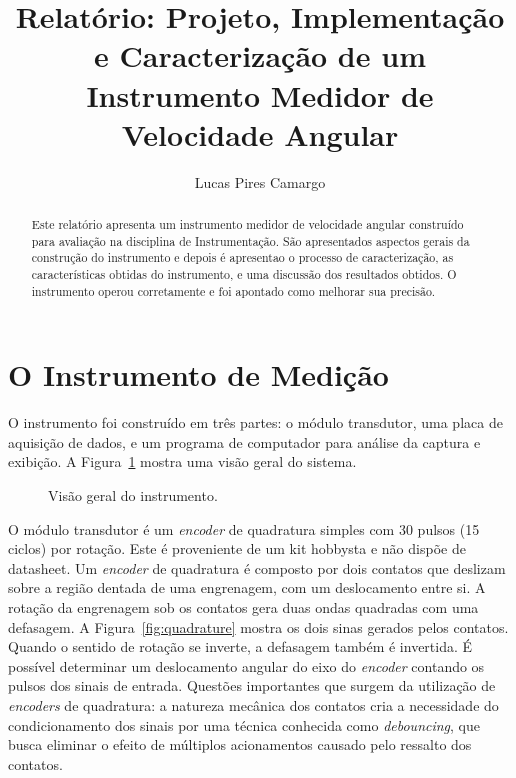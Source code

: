 \documentclass[a4paper,9pt,twocolumn]{article}
\title{Relatório: Projeto, Implementação e Caracterização de um Instrumento Medidor de Velocidade Angular}
\author{Lucas Pires Camargo}
\newcommand{\fig}[4][ht!]{
  \begin{figure}[#1]
    {\centering{\texttt{[image: \#2]}}\par}
    \caption{#3}
    \label{fig:#2}
  \end{figure}
}
\begin{document}
\maketitle

\begin{abstract}
Este relatório apresenta um instrumento medidor de velocidade angular construído para avaliação na disciplina de Instrumentação. 
São apresentados aspectos gerais da construção do instrumento e depois é apresentao o processo de caracterização, as 
características obtidas do instrumento, e uma discussão dos resultados obtidos. O instrumento operou corretamente e
foi apontado como melhorar sua precisão.
\end{abstract}


\section{O Instrumento de Medição}

O instrumento foi construído em três partes: o módulo transdutor, uma placa de aquisição de dados, 
e um programa de computador para análise da captura e exibição. A Figura~\ref{fig:impl} mostra uma visão geral do sistema.

\fig{impl}{Visão geral do instrumento.}{width=\columnwidth}

O módulo transdutor é um \emph{encoder} de quadratura simples com 30 pulsos (15 ciclos) por rotação. Este é proveniente de um kit hobbysta e não dispõe 
de datasheet. Um \emph{encoder} de quadratura é composto por dois contatos que deslizam sobre a região dentada de uma engrenagem, com um deslocamento entre si. A rotação da engrenagem sob os contatos gera duas ondas quadradas com uma defasagem. A Figura~\ref{fig:quadrature} mostra os dois sinas gerados pelos contatos. Quando o sentido de rotação se inverte, a defasagem também é invertida. É possível determinar um deslocamento angular do eixo do \emph{encoder} contando os pulsos dos sinais de entrada. Questões importantes que surgem da utilização de \emph{encoders} de quadratura: a natureza mecânica dos contatos cria a necessidade do condicionamento dos sinais por uma técnica conhecida como \emph{debouncing}, que busca eliminar o efeito de múltiplos acionamentos causado pelo ressalto dos contatos.
\end{document}
